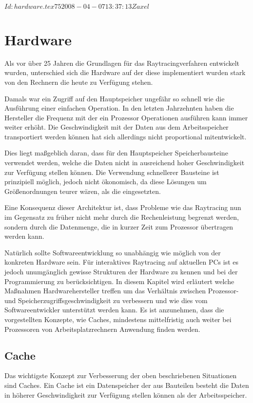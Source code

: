 \svnInfo $Id: hardware.tex 75 2008-04-07 13:37:13Z axel $
\chapter{Hardware}
\label{chap:Hardware}

Als vor über 25 Jahren die Grundlagen für das Raytracingverfahren entwickelt wurden, unterschied sich die Hardware auf der diese implementiert wurden stark von den Rechnern die heute zu Verfügung stehen.

Damals war ein Zugriff auf den Hauptspeicher ungefähr so schnell wie die Ausführung einer einfachen Operation. In den letzten Jahrzehnten haben die Hersteller die Frequenz mit der ein Prozessor Operationen ausführen kann immer weiter erhöht. Die Geschwindigkeit mit der Daten aus dem Arbeitsspeicher transportiert werden können hat sich allerdings nicht proportional mitentwickelt.

Dies liegt maßgeblich daran, dass für den Hauptspeicher Speicherbausteine verwendet werden, welche die Daten nicht in ausreichend hoher Geschwindigkeit zur Verfügung stellen können. Die Verwendung schnellerer Bausteine ist prinzipiell möglich, jedoch nicht ökonomisch, da diese Lösungen um Größenordnungen teurer wären, als die eingesetzten.\citep{Drepper07}

Eine Konsequenz dieser Architektur ist, dass Probleme wie das Raytracing nun im Gegensatz zu früher nicht mehr durch die Rechenleistung begrenzt werden, sondern durch die Datenmenge, die in kurzer Zeit zum Prozessor übertragen werden kann.

Natürlich sollte Softwareentwicklung so unabhängig wie möglich von der konkreten Hardware sein. Für interaktives Raytracing auf aktuellen PCs ist es jedoch unumgänglich gewisse Strukturen der Hardware zu kennen und bei der Programmierung zu berücksichtigen.
In diesem Kapitel wird erläutert welche Maßnahmen Hardwarehersteller treffen um das Verhältnis zwischen Prozessor- und Speicherzugriffsgeschwindigkeit zu verbessern und wie dies vom Softwareentwickler unterstützt werden kann. Es ist anzunehmen, dass die vorgestellten Konzepte, wie Caches, mindestens mittelfristig auch weiter bei Prozessoren von Arbeitsplatzrechnern Anwendung finden werden.

\section{Cache}

Das wichtigste Konzept zur Verbesserung der oben beschriebenen Situationen sind Caches. Ein Cache ist ein Datenspeicher der aus Bauteilen besteht die Daten in höherer Geschwindigkeit zur Verfügung stellen können als der Arbeitsspeicher.

